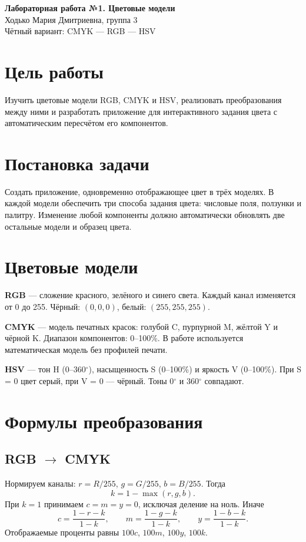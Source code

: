 \documentclass[12pt,a4paper]{article}
\begin{document}
\begin{center}
{\large\bfseries Лабораторная работа №1. Цветовые модели}\\
Ходько Мария Дмитриевна, группа 3\\
Чётный вариант: CMYK — RGB — HSV
\end{center}
\section{Цель работы}
Изучить цветовые модели RGB, CMYK и HSV, реализовать преобразования между ними и разработать приложение для интерактивного задания цвета с автоматическим пересчётом его компонентов.

\section{Постановка задачи}
Создать приложение, одновременно отображающее цвет в трёх моделях. В каждой модели обеспечить три способа задания цвета: числовые поля, ползунки и палитру. Изменение любой компоненты должно автоматически обновлять две остальные модели и образец цвета.

\section{Цветовые модели}
\textbf{RGB} — сложение красного, зелёного и синего света. Каждый канал изменяется от 0 до 255. Чёрный: $(0,0,0)$, белый: $(255,255,255)$.

\textbf{CMYK} — модель печатных красок: голубой C, пурпурной M, жёлтой Y и чёрной K. Диапазон компонентов: 0–100\%. В работе используется математическая модель без профилей печати.

\textbf{HSV} — тон H (0–360$^\circ$), насыщенность S (0–100\%) и яркость V (0–100\%). При S = 0 цвет серый, при V = 0 — чёрный. Тоны 0$^\circ$ и 360$^\circ$ совпадают.
\section{Формулы преобразования}
\subsection{RGB $\to$ CMYK}
Нормируем каналы: $r=R/255$, $g=G/255$, $b=B/255$. Тогда
\[k=1-\max(r,g,b).\]
При $k=1$ принимаем $c=m=y=0$, исключая деление на ноль. Иначе
\[c=\frac{1-r-k}{1-k},\qquad m=\frac{1-g-k}{1-k},\qquad y=\frac{1-b-k}{1-k}.\]
Отображаемые проценты равны $100c$, $100m$, $100y$, $100k$.
\end{document}
